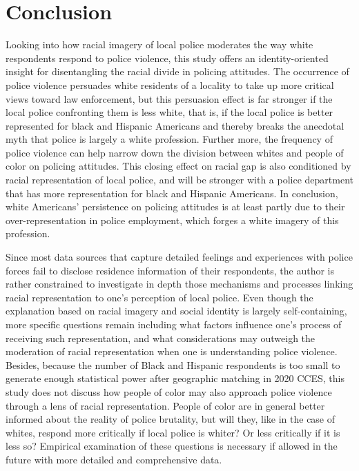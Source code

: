 \documentclass[
  12pt,
]{article}
\begin{document}
\hypertarget{conclusion}{%
\section{Conclusion}\label{conclusion}}

Looking into how racial imagery of local police moderates the way white
respondents respond to police violence, this study offers an
identity-oriented insight for disentangling the racial divide in
policing attitudes. The occurrence of police violence persuades white
residents of a locality to take up more critical views toward law
enforcement, but this persuasion effect is far stronger if the local
police confronting them is less white, that is, if the local police is
better represented for black and Hispanic Americans and thereby breaks
the anecdotal myth that police is largely a white profession. Further
more, the frequency of police violence can help narrow down the division
between whites and people of color on policing attitudes. This closing
effect on racial gap is also conditioned by racial representation of
local police, and will be stronger with a police department that has
more representation for black and Hispanic Americans. In conclusion,
white Americans' persistence on policing attitudes is at least partly
due to their over-representation in police employment, which forges a
white imagery of this profession.

Since most data sources that capture detailed feelings and experiences
with police forces fail to disclose residence information of their
respondents, the author is rather constrained to investigate in depth
those mechanisms and processes linking racial representation to one's
perception of local police. Even though the explanation based on racial
imagery and social identity is largely self-containing, more specific
questions remain including what factors influence one's process of
receiving such representation, and what considerations may outweigh the
moderation of racial representation when one is understanding police
violence. Besides, because the number of Black and Hispanic respondents
is too small to generate enough statistical power after geographic
matching in 2020 CCES, this study does not discuss how people of color
may also approach police violence through a lens of racial
representation. People of color are in general better informed about the
reality of police brutality, but will they, like in the case of whites,
respond more critically if local police is whiter? Or less critically if
it is less so? Empirical examination of these questions is necessary if
allowed in the future with more detailed and comprehensive data.
\end{document}

